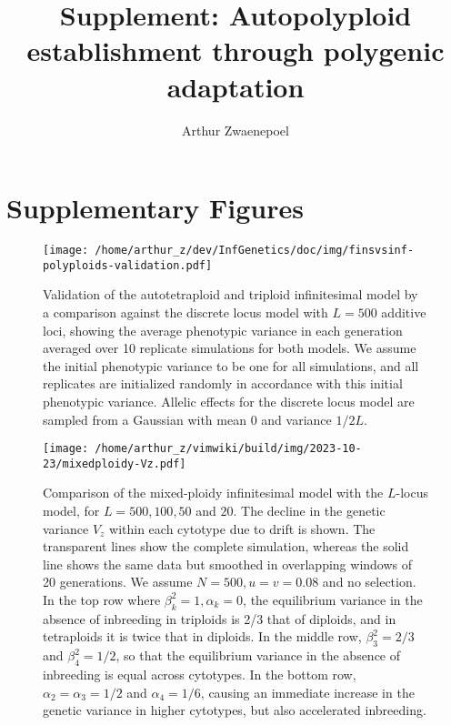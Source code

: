 \documentclass[11pt,a4paper]{article}
\begin{document}
\title{Supplement: Autopolyploid establishment through polygenic adaptation}
\author{Arthur Zwaenepoel}
\date{\vspace{-5ex}}
\maketitle
\tableofcontents
\clearpage

\section{Supplementary Figures}

\begin{figure}[H]
\centering
\texttt{[image: /home/arthur\_z/dev/InfGenetics/doc/img/finsvsinf-polyploids-validation.pdf]}
\caption{
Validation of the autotetraploid and triploid infinitesimal model by a
comparison against the discrete locus model with $L=500$ additive loci, showing
the average phenotypic variance in each generation averaged over 10 replicate
simulations for both models.
We assume the initial phenotypic variance to be one for all simulations, and
all replicates are initialized randomly in accordance with this initial
phenotypic variance.
Allelic effects for the discrete locus model are sampled from a Gaussian with
mean $0$ and variance $1/2L$.
\label{fig:fininf}}
\end{figure}

\begin{figure}[H]
\centering
\texttt{[image: /home/arthur\_z/vimwiki/build/img/2023-10-23/mixedploidy-Vz.pdf]}
\caption{Comparison of the mixed-ploidy infinitesimal model with the
\(L\)-locus model, for \(L=500,100,50\) and \(20\). The decline in the
genetic variance \(V_z\) within each cytotype due to drift is shown. The
transparent lines show the complete simulation, whereas the solid line
shows the same data but smoothed in overlapping windows of 20
generations. We assume \(N=500, u=v=0.08\) and no selection. In the top
row where \(\beta_k^2=1, \alpha_k=0\), the equilibrium variance in the
absence of inbreeding in triploids is 2/3 that of diploids, and in
tetraploids it is twice that in diploids. In the middle row,
\(\beta_3^2=2/3\) and \(\beta_4^2=1/2\), so that the equilibrium
variance in the absence of inbreeding is equal across cytotypes. In the
bottom row, \(\alpha_2= \alpha_3 =1/2\) and \(\alpha_4=1/6\), causing an
immediate increase in the genetic variance in higher cytotypes, but also
accelerated inbreeding. \label{fig:vz}}
\end{figure}
\end{document}

